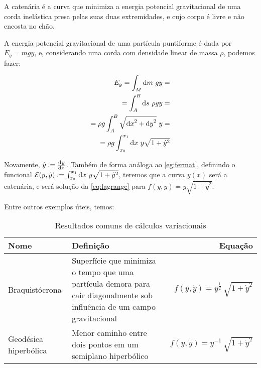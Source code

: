 \begin{eg}[Catenária]
    \label{eg:catenaria}
    A catenária é a curva que minimiza a energia potencial gravitacional de uma
    corda inelástica presa pelas suas duas extremidades, e cujo corpo é livre e
    não encosta no chão.

    A energia potencial gravitacional de uma partícula puntiforme é dada por
    $E_g = mgy$, e, considerando uma corda com densidade linear de massa $\rho$,
    podemos fazer:

    \begin{equation}
        \begin{aligned}
            E_g = \int_M \dif m ~ gy =& \\
            = \int_A^B \dif s~\rho gy =& \\
            = \rho g \int_A^B \sqrt{{\dif x}^2 + {\dif y}^2}~y =& \\
            = \rho g \int_{x_0}^{x_1} \dif x~y \sqrt{1 + {\dot y}^2}
        \end{aligned}
    \end{equation}

    Novamente, $\dot y := \tod{y}{x}$. Também de forma análoga ao
    \autoref{eg:fermat}, definindo o funcional $\mathcal{E}(y, \dot y) :=
    \int_{x_0}^{x_1} \dif x~y \sqrt{1 + {\dot y}^2}$, teremos que a curva $y(x)$
    será a catenária, e será solução da \autoref{eq:lagrange} para $f(y, \dot y)
    = y \sqrt{1 + {\dot y}^2}$.
\end{eg}

Entre outros exemplos úteis, temos:

\begin{table}[H]
    \centering
    \begin{tabularx}{\textwidth}{lXr}
        \toprule
        Nome & Definição & Equação \\
        \midrule
        Braquistócrona & %
            Superfície que minimiza o tempo que uma partícula demora para %
            cair diagonalmente sob influência de um campo gravitacional & %
            $f(y, \dot y) = y^{\frac{1}{2}}~\sqrt{1 + {\dot y}^2}$ \\
        Geodésica hiperbólica & %
            Menor caminho entre dois pontos em um semiplano hiperbólico & %
            $f(y, \dot y) = y^{-1}~\sqrt{1 + {\dot y}^2}$ \\
        \bottomrule
    \end{tabularx}
    \caption{Resultados comuns de cálculos variacionais}
    \label{tab:varcalc_eg}
\end{table}

